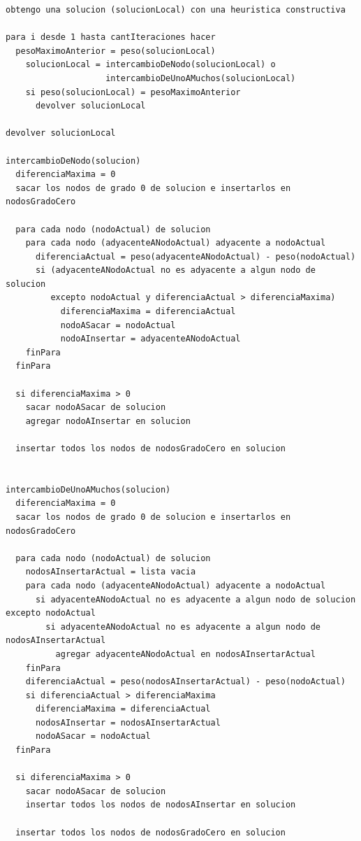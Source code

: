 \documentclass[a4paper,11pt] {article}
\begin{document}
\begin{verbatim}
obtengo una solucion (solucionLocal) con una heuristica constructiva 

para i desde 1 hasta cantIteraciones hacer
  pesoMaximoAnterior = peso(solucionLocal)
    solucionLocal = intercambioDeNodo(solucionLocal) o 
                    intercambioDeUnoAMuchos(solucionLocal)
    si peso(solucionLocal) = pesoMaximoAnterior
      devolver solucionLocal

devolver solucionLocal

intercambioDeNodo(solucion)
  diferenciaMaxima = 0
  sacar los nodos de grado 0 de solucion e insertarlos en nodosGradoCero 

  para cada nodo (nodoActual) de solucion
    para cada nodo (adyacenteANodoActual) adyacente a nodoActual
      diferenciaActual = peso(adyacenteANodoActual) - peso(nodoActual)
      si (adyacenteANodoActual no es adyacente a algun nodo de solucion 
         excepto nodoActual y diferenciaActual > diferenciaMaxima)
           diferenciaMaxima = diferenciaActual
           nodoASacar = nodoActual
           nodoAInsertar = adyacenteANodoActual
    finPara
  finPara

  si diferenciaMaxima > 0
    sacar nodoASacar de solucion
    agregar nodoAInsertar en solucion

  insertar todos los nodos de nodosGradoCero en solucion


intercambioDeUnoAMuchos(solucion)
  diferenciaMaxima = 0
  sacar los nodos de grado 0 de solucion e insertarlos en nodosGradoCero

  para cada nodo (nodoActual) de solucion
    nodosAInsertarActual = lista vacia
    para cada nodo (adyacenteANodoActual) adyacente a nodoActual
      si adyacenteANodoActual no es adyacente a algun nodo de solucion excepto nodoActual
        si adyacenteANodoActual no es adyacente a algun nodo de nodosAInsertarActual
          agregar adyacenteANodoActual en nodosAInsertarActual
    finPara
    diferenciaActual = peso(nodosAInsertarActual) - peso(nodoActual)
    si diferenciaActual > diferenciaMaxima
      diferenciaMaxima = diferenciaActual
      nodosAInsertar = nodosAInsertarActual
      nodoASacar = nodoActual
  finPara

  si diferenciaMaxima > 0
    sacar nodoASacar de solucion
    insertar todos los nodos de nodosAInsertar en solucion

  insertar todos los nodos de nodosGradoCero en solucion
\end{verbatim}
\end{document}
